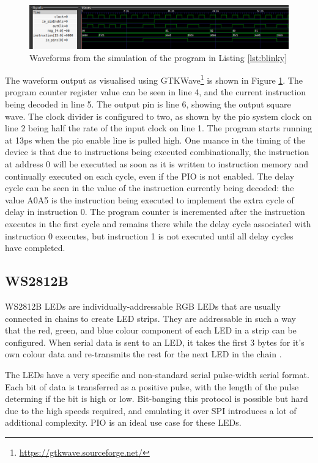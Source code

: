 \begin{figure}[H]
    \centering
    \includegraphics[width=\textwidth]{../img/wave-blink.png}
    \caption{Waveforms from the simulation of the program in Listing \ref{lst:blinky}}
    \label{fig:wave-blink}
\end{figure}

The waveform output as visualised using GTKWave\footnote{\url{https://gtkwave.sourceforge.net/}} is shown in Figure \ref{fig:wave-blink}. The program counter register value can be seen in line 4, and the current instruction being decoded in line 5. The output pin is line 6, showing the output square wave. The clock divider is configured to two, as shown by the pio system clock on line 2 being half the rate of the input clock on line 1. The program starts running at 13ps when the pio enable line is pulled high. One nuance in the timing of the device is that due to instructions being executed combinationally, the instruction at address 0 will be executted as soon as it is written to instruction memory and continually executed on each cycle, even if the PIO is not enabled. The delay cycle can be seen in the value of the instruction currently being decoded: the value A0A5 is the  instruction being executed to implement the extra cycle of delay in instruction 0. The program counter is incremented after the instruction executes in the first cycle and remains there while the delay cycle associated with instruction 0 executes, but instruction 1 is not executed until all delay cycles have completed.

\subsection{WS2812B}

WS2812B LEDs are individually-addressable RGB LEDs that are usually connected in chains to create LED strips. They are addressable in such a way that the red, green, and blue colour component of each LED in a strip can be configured. When serial data is sent to an LED, it takes the first 3 bytes for it's own colour data and re-transmits the rest for the next LED in the chain \cite{picosdk,ws2812b}.

The LEDs have a very specific and non-standard serial pulse-width serial format. Each bit of data is transferred as a positive pulse, with the length of the pulse determing if the bit is high or low. Bit-banging this protocol is possible but hard due to the high speeds required, and emulating it over SPI introduces a lot of additional complexity. PIO is an ideal use case for these LEDs.

